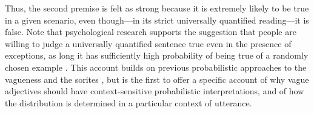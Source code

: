 \documentclass[pdfextras]{handbook}
\begin{document}
Thus, the second premise is felt as strong because it is extremely likely to be true in a given scenario, even though---in its strict universally quantified reading---it is false.
Note that psychological research supports the suggestion that people are willing to judge a universally quantified sentence true even in the presence of exceptions, as long it has sufficiently high probability of being true of a randomly chosen example \citep{sloman98}. This account builds on previous probabilistic approaches to the vagueness and the sorites \citep{borel07,black37,edgington97,lawry08,frazeebeaver10,egre11,lassiter11}, but is the first to offer a specific account of why vague adjectives should have context-sensitive probabilistic interpretations, and of how the distribution is determined in a particular context of utterance.

\end{document}
